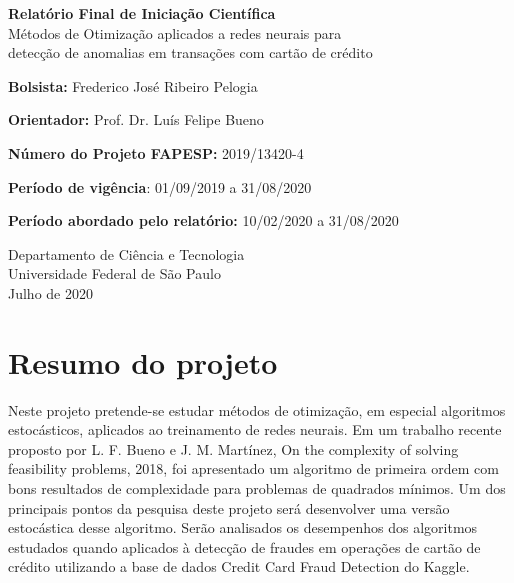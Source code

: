 \documentclass[11pt]{article}
\begin{document}
\begin{titlepage}
   \begin{center}
       \vspace*{1cm}
 
       \Large
       \textbf{Relatório Final de Iniciação Científica}\\
       Métodos de Otimização aplicados a redes neurais para \\ detecção de anomalias em transações com cartão de crédito
 	   
 	   \normalsize
       \vspace{5.5cm}
        \textbf{Bolsista:} Frederico José Ribeiro Pelogia
        
       \vspace{0.5cm}
        \textbf{Orientador:} Prof. Dr. Luís Felipe Bueno
 
       \vspace{0.5cm}
 
       \textbf{Número do Projeto FAPESP:} 2019/13420-4\\
       
      \vspace{0.5cm}
      
		\textbf{Período de vigência}: 01/09/2019 a 31/08/2020    
      
      \vspace{0.5cm}
		\textbf{Período abordado pelo relatório:} 10/02/2020 a 31/08/2020
 
       \vfill

 
 
       Departamento de Ciência e Tecnologia\\
       Universidade Federal de São Paulo\\
       Julho de 2020
 
   \end{center}
\end{titlepage}

\section*{Resumo do projeto}
 Neste projeto pretende-se estudar métodos de otimização, em especial algoritmos estocásticos,
aplicados ao treinamento de redes neurais. Em um trabalho recente proposto por L. F. Bueno e
J. M. Martínez, On the complexity of solving feasibility problems, 2018, foi apresentado um algoritmo
de primeira ordem com bons resultados de complexidade para problemas de quadrados mínimos.
Um dos principais pontos da pesquisa deste projeto será desenvolver uma versão estocástica desse
algoritmo. Serão analisados os desempenhos dos algoritmos estudados quando aplicados à detecção
de fraudes em operações de cartão de crédito utilizando a base de dados Credit Card Fraud Detection
do Kaggle.
\end{document}
